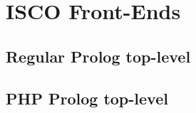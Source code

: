 
%  
%  
%  
%  


\section{ISCO Front-Ends}
\label{sec:isco-front-ends}


\subsection{Regular Prolog top-level}
\label{sec:regular-prolog-top}


\subsection{PHP Prolog top-level}
\label{sec:php-prolog-top}


